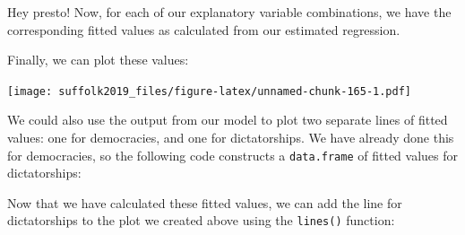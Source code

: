 \documentclass[]{article}
\newenvironment{Shaded}{\begin{snugshade}}{\end{snugshade}}
\newcommand{\DataTypeTok}[1]{\textcolor[rgb]{0.13,0.29,0.53}{#1}}
\newcommand{\DecValTok}[1]{\textcolor[rgb]{0.00,0.00,0.81}{#1}}
\newcommand{\FloatTok}[1]{\textcolor[rgb]{0.00,0.00,0.81}{#1}}
\newcommand{\KeywordTok}[1]{\textcolor[rgb]{0.13,0.29,0.53}{\textbf{#1}}}
\newcommand{\NormalTok}[1]{#1}
\newcommand{\OperatorTok}[1]{\textcolor[rgb]{0.81,0.36,0.00}{\textbf{#1}}}
\newcommand{\OtherTok}[1]{\textcolor[rgb]{0.56,0.35,0.01}{#1}}
\newcommand{\StringTok}[1]{\textcolor[rgb]{0.31,0.60,0.02}{#1}}
\begin{document}
Hey presto! Now, for each of our explanatory variable combinations, we have the corresponding fitted values as calculated from our estimated regression.

Finally, we can plot these values:

\begin{Shaded}
\end{Shaded}

\texttt{[image: suffolk2019\_files/figure-latex/unnamed-chunk-165-1.pdf]}

We could also use the output from our model to plot two separate lines of fitted values: one for democracies, and one for dictatorships. We have already done this for democracies, so the following code constructs a \texttt{data.frame} of fitted values for dictatorships:

\begin{Shaded}
\end{Shaded}

Now that we have calculated these fitted values, we can add the line for dictatorships to the plot we created above using the \texttt{lines()} function:
\end{document}
